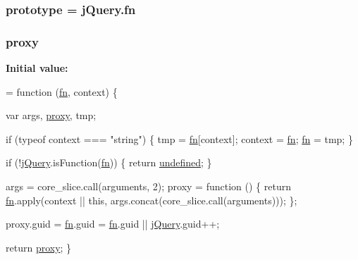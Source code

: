\subsubsection[{\texorpdfstring{prototype}{prototype}}]{ prototype = {\bf j\+Query.\+fn}}\hypertarget{jquery-2_82_81-vsdoc_8js_acdc5169db2a3bf7f13f158c44020c153}{}\label{jquery-2_82_81-vsdoc_8js_acdc5169db2a3bf7f13f158c44020c153}
\subsubsection[{\texorpdfstring{proxy}{proxy}}]{ proxy}\hypertarget{jquery-2_82_81-vsdoc_8js_af0c0a2dd63f5d59bf5dea9f132dec59e}{}\label{jquery-2_82_81-vsdoc_8js_af0c0a2dd63f5d59bf5dea9f132dec59e}
{\bfseries Initial value\+:}
\begin{DoxyCode}
= \textcolor{keyword}{function} (\hyperlink{jquery-2_82_81-vsdoc_8js_acef6bdaf6b9b20fdcca1ea86f0902c3b}{fn}, context) \{
        

        var args, \hyperlink{jquery-2_82_81-vsdoc_8js_af0c0a2dd63f5d59bf5dea9f132dec59e}{proxy}, tmp;

        \textcolor{keywordflow}{if} (typeof context === \textcolor{stringliteral}{"string"}) \{
            tmp = \hyperlink{jquery-2_82_81-vsdoc_8js_acef6bdaf6b9b20fdcca1ea86f0902c3b}{fn}[context];
            context = \hyperlink{jquery-2_82_81-vsdoc_8js_acef6bdaf6b9b20fdcca1ea86f0902c3b}{fn};
            \hyperlink{jquery-2_82_81-vsdoc_8js_acef6bdaf6b9b20fdcca1ea86f0902c3b}{fn} = tmp;
        \}

        
        
        \textcolor{keywordflow}{if} (!\hyperlink{jquery-2_82_81-vsdoc_8js_add5237586d970a38a81f990e8eb28c6c}{jQuery}.isFunction(\hyperlink{jquery-2_82_81-vsdoc_8js_acef6bdaf6b9b20fdcca1ea86f0902c3b}{fn})) \{
            \textcolor{keywordflow}{return} \hyperlink{jquery-2_82_81-vsdoc_8js_a08113a236cc18d2a9d5ce27e638012be}{undefined};
        \}

        
        args = core\_slice.call(arguments, 2);
        proxy = \textcolor{keyword}{function} () \{
            \textcolor{keywordflow}{return} \hyperlink{jquery-2_82_81-vsdoc_8js_acef6bdaf6b9b20fdcca1ea86f0902c3b}{fn}.apply(context || \textcolor{keyword}{this}, args.concat(core\_slice.call(arguments)));
        \};

        
        proxy.guid = \hyperlink{jquery-2_82_81-vsdoc_8js_acef6bdaf6b9b20fdcca1ea86f0902c3b}{fn}.guid = \hyperlink{jquery-2_82_81-vsdoc_8js_acef6bdaf6b9b20fdcca1ea86f0902c3b}{fn}.guid || \hyperlink{jquery-2_82_81-vsdoc_8js_add5237586d970a38a81f990e8eb28c6c}{jQuery}.guid++;

        \textcolor{keywordflow}{return} \hyperlink{jquery-2_82_81-vsdoc_8js_af0c0a2dd63f5d59bf5dea9f132dec59e}{proxy};
    \}
\end{DoxyCode}
